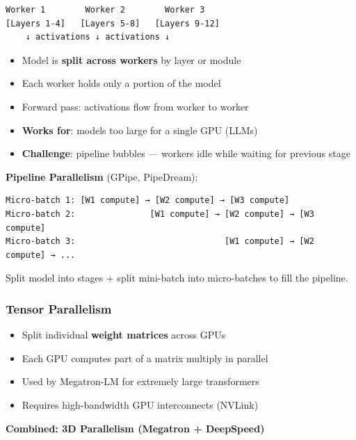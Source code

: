 \documentclass[11pt]{article}
\providecommand{\tightlist}{\setlength{\itemsep}{1pt}\setlength{\parskip}{0pt}}
\begin{document}
\setcodelang{}

\begin{verbatim}
Worker 1        Worker 2        Worker 3
[Layers 1-4]   [Layers 5-8]   [Layers 9-12]
    ↓ activations ↓ activations ↓
\end{verbatim}

\begin{itemize}
\tightlist
\item
  Model is \textbf{split across workers} by layer or module
\item
  Each worker holds only a portion of the model
\item
  Forward pass: activations flow from worker to worker
\item
  \textbf{Works for}: models too large for a single GPU (LLMs)
\item
  \textbf{Challenge}: pipeline bubbles --- workers idle while waiting for previous stage
\end{itemize}

\textbf{Pipeline Parallelism} (GPipe, PipeDream):

\setcodelang{}

\begin{verbatim}
Micro-batch 1: [W1 compute] → [W2 compute] → [W3 compute]
Micro-batch 2:               [W1 compute] → [W2 compute] → [W3 compute]
Micro-batch 3:                              [W1 compute] → [W2 compute] → ...
\end{verbatim}

Split model into stages + split mini-batch into micro-batches to fill the pipeline.

\subsubsection{Tensor Parallelism}\label{tensor-parallelism}

\begin{itemize}
\tightlist
\item
  Split individual \textbf{weight matrices} across GPUs
\item
  Each GPU computes part of a matrix multiply in parallel
\item
  Used by Megatron-LM for extremely large transformers
\item
  Requires high-bandwidth GPU interconnects (NVLink)
\end{itemize}

\textbf{Combined: 3D Parallelism (Megatron + DeepSpeed)}

\end{document}
